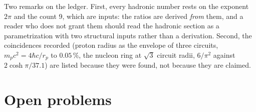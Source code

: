 \documentclass[11pt,a4paper]{article}
\theoremstyle{plain}
\theoremstyle{remark}
\begin{document}
Two remarks on the ledger. First, every hadronic number rests on the exponent $2\pi$ and the count
9, which are inputs: the ratios are derived \emph{from} them, and a reader who does not grant them
should read the hadronic section as a parametrization with two structural inputs rather than a
derivation. Second, the coincidences recorded (proton radius as the envelope of three circuits,
$m_p c^2 = 4\hbar c/r_p$ to $0.05\,\%$, the nucleon ring at $\sqrt3$ circuit radii, $6/\pi^2$
against $2\cosh\pi/37.1$) are listed because they were found, not because they are claimed.

\section{Open problems}\label{sec:open}
\end{document}
